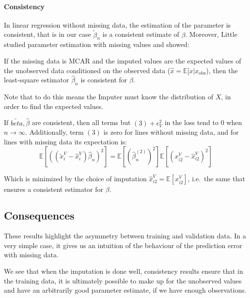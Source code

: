 
\paragraph{Consistency}
In linear regression without missing data, the estimation of the parameter is consistent\cite{consistency_linreg}, that is in our case $\tilde{\beta}_n$ is a consistent estimate of $\beta$. Moreover, Little \cite{little1992missingX} studied parameter estimation with missing values and showed:

\begin{proposition}
If the missing data is MCAR and the imputed values are the expected values of the unobserved data conditioned on the observed data ($\hat{x} = \mathbb{E}[x \vert x_{\text{obs}}$), then the least-square estimator $\hat{\beta}_n$ is consistent for $\beta$.
\end{proposition}

Note that to do this means the Imputer must know the distribution of $X$, in order to find the expected values.

If $\tilde{beta}, \hat{\beta}$ are consistent, then all terms but $(3) + \epsilon_V^2$ in the loss tend to 0 when $n\rightarrow \infty$. Additionally, term $(3)$ is zero for lines without missing data, and for lines with missing data its expectation is:
$$ \mathbb{E}[((\tilde{x}_i^V - \hat{x}_i^V) \hat{\beta}_n)^2] = \mathbb{E}[(\hat{\beta}_n^{(2)})^2] \mathbb{E}[(x_{i2}^V - \hat{x}_{i2}^V)^2] $$

Which is minimized by the choice of imputation $\hat{x}_{i2}^V = \mathbb{E}[x_{i2}^V]$, i.e.\ the same that ensures a consistent estimator for $\beta$. 
		\subsection{Consequences}
These results highlight the asymmetry between training and validation data. In a very simple case, it gives us an intuition of the behaviour of the prediction error with missing data.

We see that when the imputation is done well, consistency results ensure that in the training data, it is ultimately possible to make up for the unobserved values and have an arbitrarily good parameter estimate, if we have enough observations.

